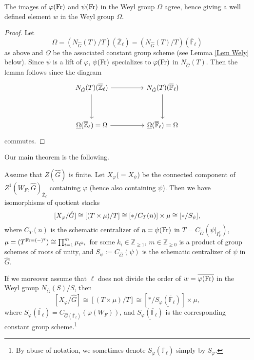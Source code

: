 \begin{lemma}\label{Lemma w}
	The images of $\varphi(\operatorname{Fr})$ and $\psi(\operatorname{Fr})$ in the Weyl group $\Omega$ agree, hence giving a well defined element $w$ in the Weyl group $\Omega$.
\end{lemma}

\begin{proof}
	Let 
	$$\Omega=\left(N_{\hat{G}}(T)/T\right)(\overline{\mathbb{Z}}_{\ell}) = \left(N_{\hat{G}}(T)/T\right)(\overline{\mathbb{F}}_{\ell})$$ 
	as above and $\underline{\Omega}$ be the associated constant group scheme (see Lemma \ref{Lem Wely} below). Since $\psi$ is a lift of $\varphi$, $\psi(\operatorname{Fr})$ specializes to $\varphi(\operatorname{Fr})$ in $N_{\hat{G}}(T)$. Then the lemma follows since 
	the diagram
	$$
	\begin{tikzcd}
		{N_{\hat{G}}(T)(\overline{\mathbb{Z}}_{\ell})} && {N_{\hat{G}}(T)(\overline{\mathbb{F}}_{\ell})} \\
		\\
		{\underline{\Omega}(\overline{\mathbb{Z}}_{\ell})=\Omega} && {\underline{\Omega}(\overline{\mathbb{F}}_{\ell})=\Omega}
		\arrow[from=1-1, to=1-3]
		\arrow[from=1-1, to=3-1]
		\arrow[from=3-1, to=3-3]
		\arrow[from=1-3, to=3-3]
	\end{tikzcd}
    $$
    commutes.
\end{proof}

Our main theorem is the following.

\begin{theorem}\label{Thm X/G}
	Assume that $Z(\hat{G})$ is finite.
	Let $X_{\varphi}$($=X_{\psi}$) be the connected component of $Z^1(W_F, \hat{G})_{\overline{\mathbb{Z}}_{\ell}}$ containing $\varphi$ (hence also containing $\psi$). Then we have isomorphisms of quotient stacks
	\begin{equation}\label{Equation: X_phi}
		[X_{\varphi}/\hat{G}] \cong [(T \times \mu)/T] \cong [*/{C_T(n)}] \times \mu \cong [*/S_{\psi}] \time \mu,
	\end{equation}
	where $C_T(n)$ is the schematic centralizer of $n=\psi(\operatorname{Fr})$ in $T=C_{\hat{G}}(\psi|_{I_F^{\ell}})$, $\mu=(T^{\operatorname{Fr}=(-)^q}) \cong \prod_{i=1}^m\mu_{\ell^{k_i}}$ for some $k_i \in \mathbb{Z}_{\geq 1}$, $m \in \mathbb{Z}_{\geq 0}$ is a product of group schemes of roots of unity, and $S_{\psi}:=C_{\hat{G}}(\psi)$ is the schematic centralizer of $\psi$ in $\hat{G}$. 
	
	If we moreover assume that
    $\ell$ does not divide the order of $w=\overline{\varphi(\operatorname{Fr})}$ in the Weyl group $N_{\hat{G}}(S)/S$,
	then 
	$$[X_{\varphi}/\hat{G}] \cong [(T \times \mu)/T] \cong [*/\underline{S_{\varphi}(\overline{\mathbb{F}}_{\ell})}] \times \mu,$$
	where $S_{\varphi}(\overline{\mathbb{F}}_{\ell})=C_{\hat{G}(\overline{\mathbb{F}}_{\ell})}(\varphi(W_F))$, and $\underline{S_{\varphi}(\overline{\mathbb{F}}_{\ell})}$ is the corresponding constant group scheme.\footnote{By abuse of notation, we sometimes denote $S_{\varphi}(\overline{\mathbb{F}}_{\ell})$ simply by $S_{\varphi}$.}
\end{theorem}

